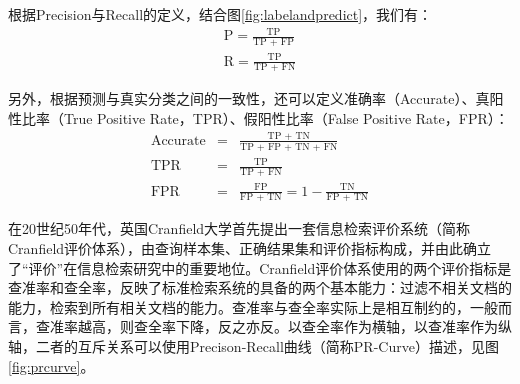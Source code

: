 根据Precision与Recall的定义，结合图\ref{fig:labelandpredict}，我们有：
\begin{equation}
  \begin{array}{l}
    \text{P} = \frac{\text{TP}}{\text{TP + FP}} \\
    \text{R} = \frac{\text{TP}}{\text{TP + FN}}
  \end{array}
\end{equation}

另外，根据预测与真实分类之间的一致性，还可以定义准确率（Accurate）、真阳性比率（True Positive Rate，TPR）、假阳性比率（False Positive Rate，FPR）：
\begin{equation}
  \begin{array}{rcl}
    \text{Accurate} &=& \frac{\text{TP + TN}}{\text{TP + FP + TN + FN}} \\
    \text{TPR} &=& \frac{\text{TP}}{\text{TP + FN}} \\
    \text{FPR} &=& \frac{\text{FP}}{\text{FP + TN}} = 1 - \frac{\text{TN}}{\text{FP + TN}}
  \end{array}
\end{equation}

在20世纪50年代，英国Cranfield大学首先提出一套信息检索评价系统（简称Cranfield评价体系），由查询样本集、正确结果集和评价指标构成，并由此确立了“评价”在信息检索研究中的重要地位。Cranfield评价体系使用的两个评价指标是查准率和查全率，反映了标准检索系统的具备的两个基本能力：过滤不相关文档的能力，检索到所有相关文档的能力。查准率与查全率实际上是相互制约的，一般而言，查准率越高，则查全率下降，反之亦反。以查全率作为横轴，以查准率作为纵轴，二者的互斥关系可以使用Precison-Recall曲线（简称PR-Curve）\cite{davis2006relationship}描述，见图\ref{fig:prcurve}。

